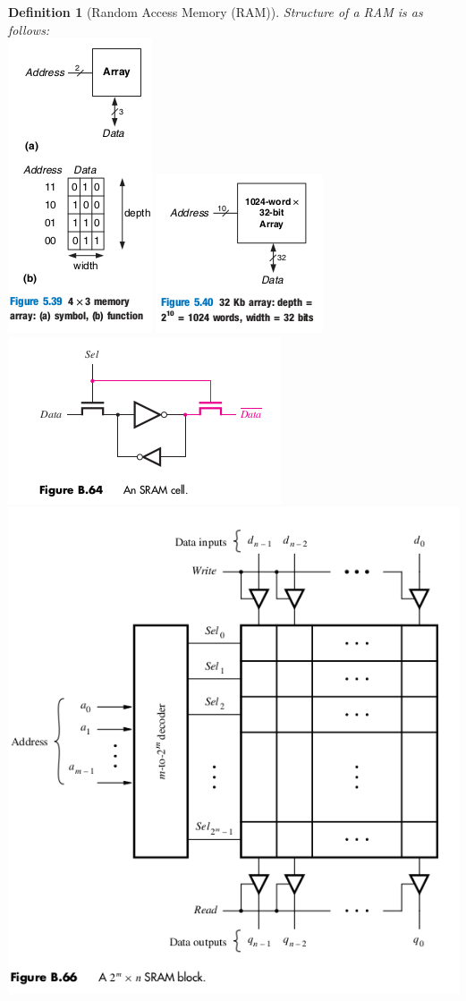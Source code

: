 \documentclass{article}
\newtheorem{definition}{Definition}
\begin{document}
\begin{definition}[Random Access Memory (RAM)] Structure of a RAM is as follows:\\
  \includegraphics[width=0.3\linewidth]{./media/memory-array.png}
  \includegraphics[width=0.3\linewidth]{./media/memory-array-32kb.png}
  \includegraphics[width=0.3\linewidth]{./media/SRAM-cell.png}\\
  \includegraphics[width=0.7\linewidth]{./media/SRAM.png}
\end{definition}
\end{document}
